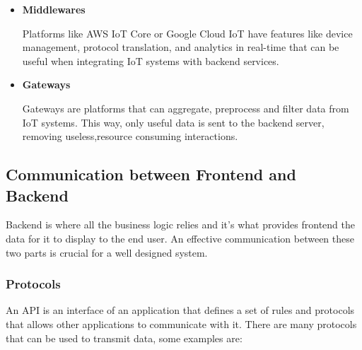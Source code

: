 \begin{itemize}

	\item \textbf{Middlewares}

	      Platforms like AWS IoT Core or Google Cloud IoT have features like
	      device management, protocol translation, and analytics in real-time that
	      can be useful when integrating IoT systems with backend services.

	\item \textbf{Gateways}

	      Gateways are platforms that can aggregate, preprocess and filter data
	      from IoT systems. This way, only useful data is sent to the backend server,
	      removing useless,resource consuming interactions.

\end{itemize}

\subsection{Communication between Frontend and Backend}
Backend is where all the business logic relies and it's what provides frontend
the data for it to display to the end user. An effective communication between
these two parts is crucial for a well designed system.
\subsubsection{Protocols}
An API is an interface of an application that defines a set of rules and
protocols that allows other applications to communicate with it. There are many
protocols that can be used to transmit data, some examples are:

